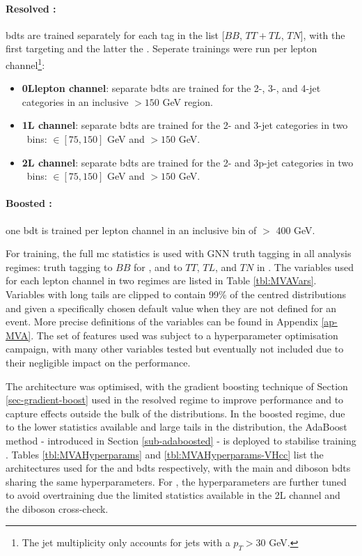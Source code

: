 \paragraph{Resolved \vhbc:} \gls{bdt}s are trained separately for each tag in the list [$BB$, $TT+TL$, $TN$], with the first targeting \vhb and the latter the \vhc. Seperate trainings were run per lepton channel\footnote{The jet multiplicity only accounts for jets with a $p_T > 30$ GeV.}:
\begin{itemize}
    \item \textbf{0Llepton channel}: separate \gls{bdt}s are trained for the 2-, 3-, and 4-jet categories in an inclusive \ptv $> 150$ GeV region.
    \item \textbf{1L channel}: separate \gls{bdt}s are trained for the 2- and 3-jet categories in two \ptv\ bins: \ptv $\in [75, 150]$ GeV and \ptv $> 150$ GeV.
    \item \textbf{2L channel}: separate \gls{bdt}s are trained for the 2- and 3p-jet categories in two \ptv\ bins: \ptv $\in [75, 150]$ GeV and \ptv $> 150$ GeV.
\end{itemize}
\paragraph{Boosted \vhb:} one \gls{bdt} is trained per lepton channel in an inclusive bin of \ptv $>$ 400 GeV.

For training, the full \gls{mc} statistics is used with GNN truth tagging in all analysis regimes: truth tagging to $BB$ for \vhb, and to $TT$, $TL$, and $TN$ in \vhc. The variables used for each lepton channel in two regimes are listed in Table \ref{tbl:MVAVars}. Variables with long tails are clipped to contain 99\% of the centred distributions and given a specifically chosen default value when they are not defined for an event. More precise definitions of the variables can be found in Appendix \ref{ap-MVA}. The set of features used was subject to a hyperparameter optimisation campaign, with many other variables tested but eventually not included due to their negligible impact on the performance. 



The architecture was optimised, with the gradient boosting technique of Section \ref{sec-gradient-boost} used in the resolved regime to improve performance and to capture effects outside the bulk of the distributions. In the boosted regime, due to the lower statistics available and large tails in the distribution, the AdaBoost method - introduced in Section \ref{sub-adaboosted} - is deployed to stabilise training \cite{Adaboost}. Tables \ref{tbl:MVAHyperparams} and \ref{tbl:MVAHyperparams-VHcc} list the architectures used for the \vhb and \vhc \gls{bdt}s respectively, with the main and diboson \gls{bdt}s sharing the same hyperparameters. For \vhc, the hyperparameters are further tuned to avoid overtraining due the limited statistics available in the 2L channel and the diboson cross-check.

